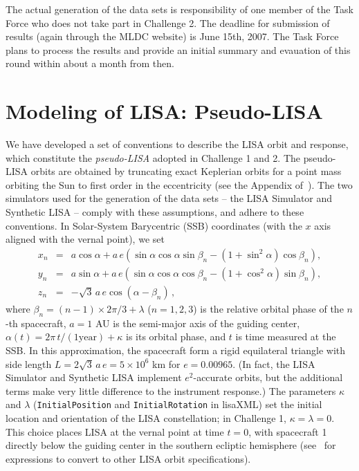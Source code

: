 \documentclass[12pt]{iopart}
\begin{document}
The actual generation of the data sets is responsibility of one member of the Task Force who does not take part in Challenge 2. The deadline for submission of results (again through the MLDC website) is June 15th, 2007. The Task Force plans to process the results and provide an initial summary and evauation of this round within about a month from then.

\section{Modeling of LISA: Pseudo-LISA}
\label{s:lisa}

We have developed a set of conventions to describe the LISA orbit and response, which constitute the \emph{pseudo-LISA} adopted in Challenge 1 and 2. The pseudo-LISA orbits are obtained by truncating exact Keplerian orbits for a point mass orbiting the Sun to first order in the eccentricity (see the Appendix of~\cite{lisasimulator}). The two simulators used for the generation of the data sets -- the LISA Simulator \cite{lisasimulator} and Synthetic LISA \cite{synthlisa} -- comply with these assumptions, and adhere to these conventions. In Solar-System Barycentric (SSB) coordinates (with the $x$ axis aligned with the vernal point), we set
%
\begin{eqnarray}
x_n &=& a\cos \alpha + a \, e\left(\sin\alpha\cos\alpha\sin\beta_n
-(1+\sin^2\alpha)\cos\beta_n\right), \nonumber \\
y_n &=& a\sin \alpha + a \, e\left(\sin\alpha\cos\alpha\cos\beta_n
-(1+\cos^2\alpha)\sin\beta_n\right), \\
z_n & = & -\sqrt{3} \, a \, e \cos(\alpha-\beta_n) \, , \nonumber
\end{eqnarray}
%
where $\beta_n = (n-1)\times2\pi/3 + \lambda$ ($n=1, 2, 3$) is the relative orbital phase of the $n$-th spacecraft, $a = 1$ AU is the semi-major axis of the guiding center, $\alpha(t)=2 \pi \, t / (1 \mathrm{year}) + \kappa$ is its orbital phase, and $t$ is time measured at the SSB. In this approximation, the spacecraft form a rigid equilateral triangle with side length $L = 2\sqrt{3} \, a \, e = 5\times 10^6$ km for $e=0.00965$. (In fact, the LISA Simulator and Synthetic LISA implement $e^2$-accurate orbits, but the additional terms make very little difference to the instrument response.) The parameters $\kappa$ and $\lambda$ (\texttt{InitialPosition} and \texttt{InitialRotation} in lisaXML) set the initial location and orientation of the LISA constellation; in Challenge 1, $\kappa=\lambda=0$. This choice places LISA at the vernal point at time $t=0$, with spacecraft 1 directly below the guiding center in the southern ecliptic hemisphere (see~\cite{MLDCdoc} for expressions to convert to other LISA orbit specifications). 
\end{document}
